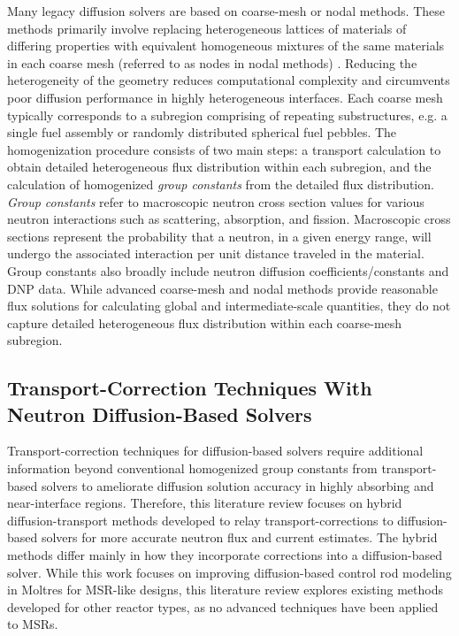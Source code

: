 Many legacy diffusion solvers are based on coarse-mesh or nodal methods. These methods
primarily involve replacing heterogeneous lattices of materials of differing properties with
equivalent homogeneous mixtures of the same materials in each coarse mesh (referred to as nodes in
nodal methods) \cite{stacey_nuclear_2007}. Reducing the heterogeneity of the geometry reduces
computational complexity and circumvents poor diffusion performance in highly heterogeneous
interfaces. Each coarse mesh typically corresponds to a subregion comprising of repeating
substructures, e.g. a single fuel assembly or randomly distributed spherical fuel pebbles. The
homogenization procedure consists of two main steps: a transport calculation to obtain detailed
heterogeneous flux distribution within each subregion, and the calculation of homogenized
\textit{group constants} from the detailed flux distribution. \textit{Group constants} refer to
macroscopic neutron cross section values for various neutron interactions such as
scattering, absorption, and fission. Macroscopic cross sections represent the probability that a
neutron, in a given energy range, will undergo the associated interaction per unit distance
traveled in the material. Group constants also broadly include neutron diffusion
coefficients/constants and \gls{DNP} data. While advanced coarse-mesh and nodal
methods provide reasonable flux solutions for calculating global and intermediate-scale quantities,
they do not capture detailed heterogeneous flux distribution within each coarse-mesh subregion.

\subsection{Transport-Correction Techniques With Neutron Diffusion-Based Solvers}

Transport-correction techniques for diffusion-based solvers require additional information beyond
conventional homogenized group constants from transport-based solvers to ameliorate diffusion
solution accuracy in highly absorbing and near-interface regions.
Therefore, this literature review focuses on hybrid diffusion-transport methods developed to relay
transport-corrections to diffusion-based solvers for more accurate neutron flux and current
estimates. The hybrid methods differ mainly in how they incorporate corrections into a
diffusion-based solver. While this work focuses on improving diffusion-based control rod
modeling in Moltres for \gls{MSR}-like designs, this literature review explores existing methods
developed for other reactor types, as no advanced techniques have been applied to \glspl{MSR}.

